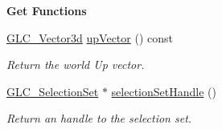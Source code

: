 \begin{Indent}{\bf Get Functions}
\begin{DoxyCompactItemize}
\hyperlink{class_g_l_c___vector3d}{G\-L\-C\-\_\-\-Vector3d} \hyperlink{class_g_l_c___world_handle_a7695d653f3609ee372279514a8393e63}{up\-Vector} () const 
\begin{DoxyCompactList}\small\item\em Return the world Up vector. \end{DoxyCompactList}\item 
\hyperlink{class_g_l_c___selection_set}{G\-L\-C\-\_\-\-Selection\-Set} $\ast$ \hyperlink{class_g_l_c___world_handle_a5520bdcf6f264d87c5d3c87843412c9e}{selection\-Set\-Handle} ()
\begin{DoxyCompactList}\small\item\em Return an handle to the selection set. \end{DoxyCompactList}\end{DoxyCompactItemize}
\end{Indent}
